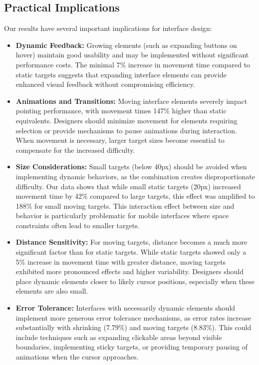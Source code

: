 \documentclass[acmlarge]{acmart}
\begin{document}
\subsection{Practical Implications}

Our results have several important implications for interface design:

\begin{itemize}
   \item \textbf{Dynamic Feedback:} Growing elements (such as expanding buttons on hover) maintain good usability and may be implemented without significant performance costs. The minimal 7\% increase in movement time compared to static targets suggests that expanding interface elements can provide enhanced visual feedback without compromising efficiency.
   
   \item \textbf{Animations and Transitions:} Moving interface elements severely impact pointing performance, with movement times 147\% higher than static equivalents. Designers should minimize movement for elements requiring selection or provide mechanisms to pause animations during interaction. When movement is necessary, larger target sizes become essential to compensate for the increased difficulty.
   
   \item \textbf{Size Considerations:} Small targets (below 40px) should be avoided when implementing dynamic behaviors, as the combination creates disproportionate difficulty. Our data shows that while small static targets (20px) increased movement time by 42\% compared to large targets, this effect was amplified to 188\% for small moving targets. This interaction effect between size and behavior is particularly problematic for mobile interfaces where space constraints often lead to smaller targets.
   
   \item \textbf{Distance Sensitivity:} For moving targets, distance becomes a much more significant factor than for static targets. While static targets showed only a 5\% increase in movement time with greater distance, moving targets exhibited more pronounced effects and higher variability. Designers should place dynamic elements closer to likely cursor positions, especially when these elements are also small.
   
   \item \textbf{Error Tolerance:} Interfaces with necessarily dynamic elements should implement more generous error tolerance mechanisms, as error rates increase substantially with shrinking (7.79\%) and moving targets (8.83\%). This could include techniques such as expanding clickable areas beyond visible boundaries, implementing sticky targets, or providing temporary pausing of animations when the cursor approaches.
\end{itemize}
\end{document}
